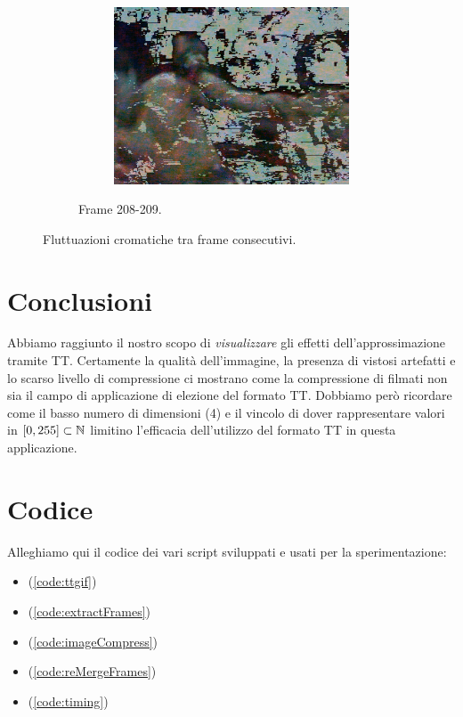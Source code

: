 \documentclass[11pt,a4paper]{article}
\begin{document}
\begin{figure}
\begin{subfigure}[]{\wid\textwidth}
    \begin{subfigure}[]{\wid\textwidth}
      \centering
      \includegraphics[keepaspectratio=true, scale=\scal]{Imgs/MuhammadAli/frame-209}
    \end{subfigure}
    \caption{Frame 208-209.}
  \end{subfigure}
  \caption{Fluttuazioni cromatiche tra frame consecutivi.}\label{fig:muhammadali_color_flickering}
\end{figure}

\section{Conclusioni}
Abbiamo raggiunto il nostro scopo di \emph{visualizzare} gli effetti dell'approssimazione tramite TT. Certamente la qualità dell'immagine, la presenza di vistosi artefatti e lo scarso livello di compressione ci mostrano come la compressione di filmati non sia il campo di applicazione di elezione del formato TT.
Dobbiamo però ricordare come il basso numero di dimensioni (4) e il vincolo di dover rappresentare valori in $[0,255]\subset\mathbb{N}$ limitino l'efficacia dell'utilizzo del formato TT in questa applicazione.

\newpage

\appendix
\section{Codice}\label{code:all}
Alleghiamo qui il codice dei vari script sviluppati e usati per la sperimentazione:
\begin{itemize}
\item {} (\ref{code:ttgif})
\item {} (\ref{code:extractFrames})
\item {} (\ref{code:imageCompress})
\item {} (\ref{code:reMergeFrames})
\item {} (\ref{code:timing})
\end{itemize}
\end{document}

